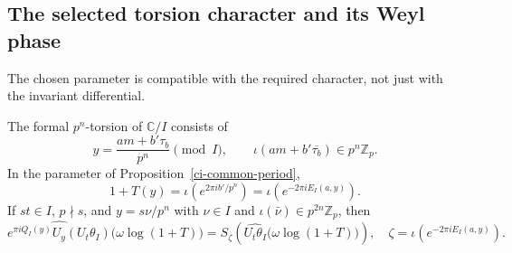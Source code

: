 \subsection{The selected torsion character and its Weyl phase}

The chosen parameter is compatible with the required
character, not just with the invariant differential.

\begin{proposition}\label{ci-character}
The formal $p^n$-torsion of $\mathbb C/I$ consists of
\[
 y=\frac{am+b'\tau_b}{p^n}\pmod I,\qquad
 \iota(am+b'\overline{\tau_b})\in p^n\mathbb Z_p.
 \tag{CI8}
\]
In the parameter of Proposition~\ref{ci-common-period},
\[
                1+T(y)=\iota(e^{2\pi ib'/p^n})
                         =\iota(e^{-2\pi iE_I(a,y)}).
 \tag{CI9}
\]
If $st\in I$, $p\nmid s$, and
$y=s\nu/p^n$ with $\nu\in I$ and
$\iota(\bar\nu)\in p^{2n}\mathbb Z_p$, then
\[
 \widehat{e^{\pi iQ_I(y)}U_y(U_t\theta_I)}
                       \bigl(\omega\log(1+T)\bigr)
  =S_\zeta\!\left(\widehat{U_t\theta_I}
                       \bigl(\omega\log(1+T)\bigr)\right),
 \quad
 \zeta=\iota(e^{-2\pi iE_I(a,y)}).
 \tag{CI10}
\]
\end{proposition}
